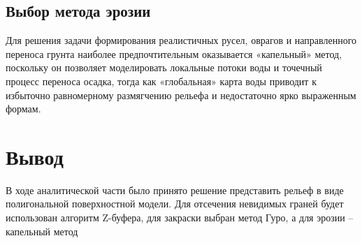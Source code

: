 \subsection{Выбор метода эрозии}

Для решения задачи формирования реалистичных русел, оврагов и направленного переноса грунта наиболее
предпочтительным оказывается «капельный» метод, поскольку он позволяет моделировать локальные потоки воды и точечный
процесс переноса осадка, тогда как «глобальная» карта воды приводит к избыточно равномерному размягчению
рельефа и недостаточно ярко выраженным формам.

\section*{Вывод}

В ходе аналитической части было принято решение представить рельеф в виде полигональной поверхностной модели. Для отсечения
невидимых граней будет использован алгоритм Z-буфера, для закраски выбран метод Гуро, а для эрозии -- капельный метод